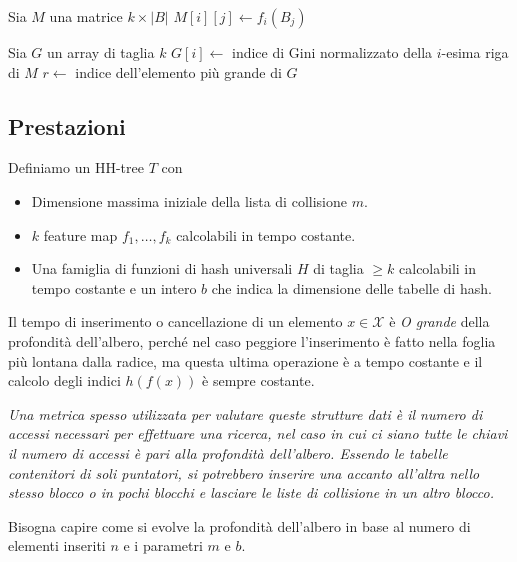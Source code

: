 \documentclass[a4paper]{article}
\begin{document}
\begin{algorithm}[H]
	\DontPrintSemicolon

	\;


	Sia $M$ una matrice $k \times |B|$ \;
	 {
		 {
			$M[i][j] \gets f_i(B_j)$ \;
		}
	}

	Sia $G$ un array di taglia $k$ \;
	 {
		$G[i] \gets$ indice di Gini normalizzato della $i$-esima riga di $M$ \;
	}
	$r \gets$ indice dell'elemento più grande di $G$ \;


	\;

\end{algorithm}

\subsection*{Prestazioni}

Definiamo un HH-tree $T$ con
\begin{itemize}
	\item Dimensione massima iniziale della lista di collisione $m$.
	\item $k$ feature map $f_1, \ldots, f_k$ calcolabili in tempo costante.
	\item Una famiglia di funzioni di hash universali $H$ di taglia $\geq k$ calcolabili in tempo costante e un intero $b$ che indica la dimensione delle tabelle di hash.
\end{itemize}
Il tempo di inserimento o cancellazione di un elemento $x \in \mathcal{X}$ è \textit{O grande} della profondità dell'albero, perché nel caso peggiore l'inserimento è fatto nella foglia più lontana dalla radice, ma questa ultima operazione è a tempo costante e il calcolo degli indici $h(f(x))$ è sempre costante.

\textit{Una metrica spesso utilizzata per valutare queste strutture dati è il numero di accessi necessari per effettuare una ricerca, nel caso in cui ci siano tutte le chiavi il numero di accessi è pari alla profondità dell'albero. Essendo le tabelle contenitori di soli puntatori, si potrebbero inserire una accanto all'altra nello stesso blocco o in pochi blocchi e lasciare le liste di collisione in un altro blocco.}

Bisogna capire come si evolve la profondità dell'albero in base al numero di elementi inseriti $n$ e i parametri $m$ e $b$.
\end{document}
